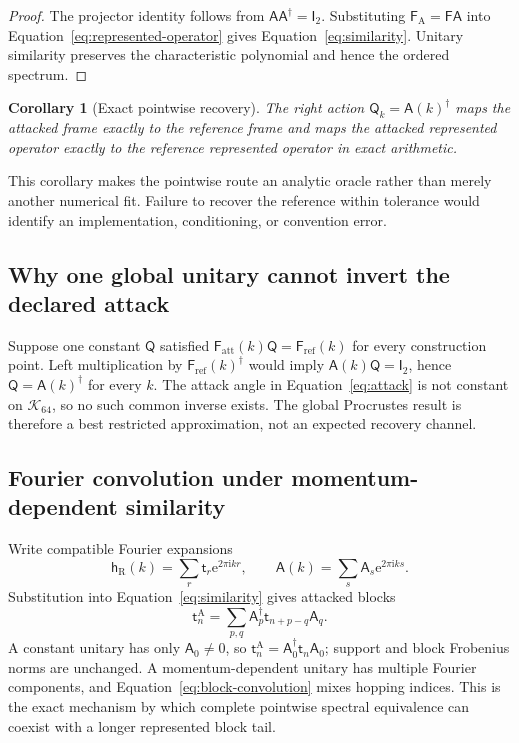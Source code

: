 \documentclass[11pt]{article}
\newcommand{\ee}{\mathrm{e}}
\newcommand{\ii}{\mathrm{i}}
\newcommand{\mat}[1]{\mathsf{#1}}
\newtheorem{corollary}{Corollary}
\begin{document}
\begin{proof}
The projector identity follows from $\mat A\mat A^{\dagger}=\mat I_2$.
Substituting $\mat F_{\mathrm A}=\mat F\mat A$ into
Equation~\eqref{eq:represented-operator} gives Equation~\eqref{eq:similarity}.  Unitary
similarity preserves the characteristic polynomial and hence the ordered spectrum.
\end{proof}

\begin{corollary}[Exact pointwise recovery]
The right action $\mat Q_k=\mat A(k)^{\dagger}$ maps the attacked frame exactly to the
reference frame and maps the attacked represented operator exactly to the reference
represented operator in exact arithmetic.
\end{corollary}

This corollary makes the pointwise route an analytic oracle rather than merely another
numerical fit.  Failure to recover the reference within tolerance would identify an
implementation, conditioning, or convention error.

\subsection{Why one global unitary cannot invert the declared attack}

Suppose one constant $\mat Q$ satisfied
$\mat F_{\mathrm{att}}(k)\mat Q=\mat F_{\mathrm{ref}}(k)$ for every construction point.
Left multiplication by $\mat F_{\mathrm{ref}}(k)^{\dagger}$ would imply
$\mat A(k)\mat Q=\mat I_2$, hence $\mat Q=\mat A(k)^{\dagger}$ for every $k$.  The
attack angle in Equation~\eqref{eq:attack} is not constant on $\mathcal K_{64}$, so no
such common inverse exists.  The global Procrustes result is therefore a best restricted
approximation, not an expected recovery channel.

\subsection{Fourier convolution under momentum-dependent similarity}

Write compatible Fourier expansions
\begin{equation}
 \mat h_{\mathrm R}(k)=\sum_r \mat t_r\ee^{2\pi\ii kr},
 \qquad
 \mat A(k)=\sum_s \mat A_s\ee^{2\pi\ii ks}.
\end{equation}
Substitution into Equation~\eqref{eq:similarity} gives attacked blocks
\begin{equation}
 \mat t^{\mathrm A}_{n}
 =\sum_{p,q}\mat A_p^{\dagger}\mat t_{n+p-q}\mat A_q.
 \label{eq:block-convolution}
\end{equation}
A constant unitary has only $\mat A_0\ne0$, so
$\mat t^{\mathrm A}_{n}=\mat A_0^{\dagger}\mat t_n\mat A_0$; support and block
Frobenius norms are unchanged.  A momentum-dependent unitary has multiple Fourier
components, and Equation~\eqref{eq:block-convolution} mixes hopping indices.  This is the
exact mechanism by which complete pointwise spectral equivalence can coexist with a
longer represented block tail.
\end{document}
